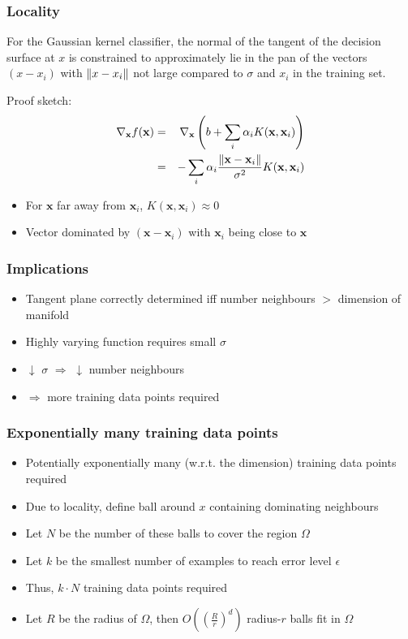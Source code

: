 \begin{frame}
	\frametitle{Locality}
	\begin{theorem}
		For the Gaussian kernel classifier, the normal of the tangent of the decision surface at $x$ is constrained to approximately lie in the pan of the vectors $(x-x_i)$ with $\lVert x-x_i\rVert$ not large compared to $\sigma$ and $x_i$ in the training set.
	\end{theorem}
	
	Proof sketch:
	\begin{eqnarray*}
		\nabla_{\mathbf{x}}f(\mathbf{x}) &=& \nabla_{\mathbf{x}} \left( b + \sum_{i} \alpha_i K(\mathbf{x},\mathbf{x}_i) \right)\\
		&=& -\sum_{i} \alpha_i \frac{\lVert\mathbf{x}-\mathbf{x}_i\rVert}{\sigma^2}K(\mathbf{x},\mathbf{x}_i)
	\end{eqnarray*}
	
	\begin{itemize}
		\item For $\mathbf{x}$ far away from $\mathbf{x}_i$, $K(\mathbf{x},\mathbf{x}_i)\approx 0$
		\item Vector dominated by $(\mathbf{x}-\mathbf{x}_i)$ with $\mathbf{x}_i$ being close to $\mathbf{x}$
	\end{itemize}
\end{frame}

\begin{frame}
	\frametitle{Implications}
	\begin{itemize}
		\item Tangent plane correctly determined iff number neighbours $>$ dimension of manifold
		\item Highly varying function requires small $\sigma$
		\item $\downarrow$ $\sigma$ $\Rightarrow$ $\downarrow$ number neighbours
		\item $\Rightarrow$ more training data points required
	\end{itemize}
\end{frame}

\begin{frame}
	\frametitle{Exponentially many training data points}
	\begin{itemize}
		\item Potentially exponentially many (w.r.t. the dimension) training data points required
		\item Due to locality, define ball around $x$ containing dominating neighbours
		\item Let $N$ be the number of these balls to cover the region $\Omega$
		\item Let $k$ be the smallest number of examples to reach error level $\epsilon$
		\item Thus, $k\cdot N$ training data points required
		\item Let $R$ be the radius of $\Omega$, then $O\left(\left(\frac{R}{r}\right)^d\right)$ radius-$r$ balls fit in $\Omega$
	\end{itemize}
\end{frame}
